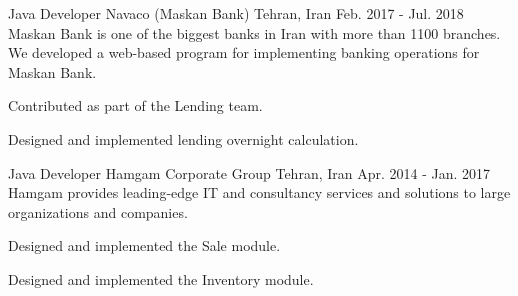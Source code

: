 \begin{cventries}
  \cventry
    {Java Developer} %
    {Navaco (Maskan Bank)} %
    {Tehran, Iran} %
    {Feb. 2017 - Jul. 2018} %
    {
      Maskan Bank is one of the biggest banks in Iran with more than 1100 branches.
      We developed a web-based program for implementing banking operations for Maskan Bank.
    }
    {
      \begin{cvitems} %
        \item {Contributed as part of the Lending team.}
        \item {Designed and implemented lending overnight calculation.}
      \end{cvitems}
    }

  \cventry
    {Java Developer} %
    {Hamgam Corporate Group} %
    {Tehran, Iran} %
    {Apr. 2014 - Jan. 2017} %
    {
      Hamgam provides leading-edge IT and consultancy services and solutions to large organizations and companies.
    }
    {
      \begin{cvitems} %
        \item {Designed and implemented the Sale module.}
        \item {Designed and implemented the Inventory module.}
      \end{cvitems}
    }

\end{cventries}
